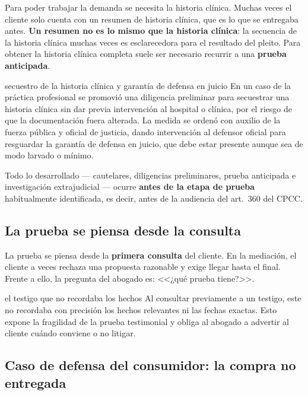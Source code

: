 \documentclass[12pt,oneside]{book}
\begin{document}
Para poder trabajar la demanda se necesita la historia clínica. Muchas veces el cliente solo cuenta con un resumen de historia clínica, que es lo que se entregaba antes. \textbf{Un resumen no es lo mismo que la historia clínica}: la secuencia de la historia clínica muchas veces es esclarecedora para el resultado del pleito. Para obtener la historia clínica completa suele ser necesario recurrir a una \textbf{prueba anticipada}.

\begin{example}{secuestro de la historia clínica y garantía de defensa en juicio}
En un caso de la práctica profesional se promovió una diligencia preliminar para secuestrar una historia clínica sin dar previa intervención al hospital o clínica, por el riesgo de que la documentación fuera alterada. La medida se ordenó con auxilio de la fuerza pública y oficial de justicia, dando intervención al defensor oficial para resguardar la garantía de defensa en juicio, que debe estar presente aunque sea de modo larvado o mínimo.
\end{example}

Todo lo desarrollado --- cautelares, diligencias preliminares, prueba anticipada e investigación extrajudicial --- ocurre \textbf{antes de la etapa de prueba} habitualmente identificada, es decir, antes de la audiencia del art.\ 360 del CPCC.

\subsection{La prueba se piensa desde la consulta}

La prueba se piensa desde la \textbf{primera consulta} del cliente. En la mediación, el cliente a veces rechaza una propuesta razonable y exige llegar hasta el final. Frente a ello, la pregunta del abogado es: <<¿qué prueba tiene?>>.

\begin{example}{el testigo que no recordaba los hechos}
Al consultar previamente a un testigo, este no recordaba con precisión los hechos relevantes ni las fechas exactas. Esto expone la fragilidad de la prueba testimonial y obliga al abogado a advertir al cliente cuándo conviene o no litigar.
\end{example}

\subsection{Caso de defensa del consumidor: la compra no entregada}
\end{document}
